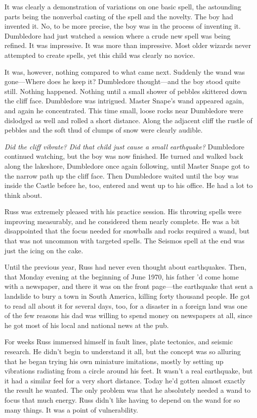 It was clearly a demonstration of variations on one basic spell, the astounding parts being the nonverbal casting of the spell and the novelty. The boy had invented it. No, to be more precise, the boy was in the process of inventing it. Dumbledore had just watched a session where a crude new spell was being refined. It was impressive. It was more than impressive. Most older wizards never attempted to create spells, yet this child was clearly no novice.

It was, however, nothing compared to what came next. Suddenly the wand was gone—Where does he keep it? Dumbledore thought—and the boy stood quite still. Nothing happened. Nothing until a small shower of pebbles skittered down the cliff face. Dumbledore was intrigued. Master Snape's wand appeared again, and again he concentrated. This time small, loose rocks near Dumbledore were dislodged as well and rolled a short distance. Along the adjacent cliff the rustle of pebbles and the soft thud of clumps of snow were clearly audible.

\emph{Did the cliff vibrate? Did that child just cause a small earthquake?} Dumbledore continued watching, but the boy was now finished. He turned and walked back along the lakeshore, Dumbledore once again following, until Master Snape got to the narrow path up the cliff face. Then Dumbledore waited until the boy was inside the Castle before he, too, entered and went up to his office. He had a lot to think about.

Russ was extremely pleased with his practice session. His throwing spells were improving measurably, and he considered them nearly complete. He was a bit disappointed that the focus needed for snowballs and rocks required a wand, but that was not uncommon with targeted spells. The Seismos spell at the end was just the icing on the cake.

Until the previous year, Russ had never even thought about earthquakes. Then, that Monday evening at the beginning of June 1970, his father 'd come home with a newspaper, and there it was on the front page—the earthquake that sent a landslide to bury a town in South America, killing forty thousand people. He got to read all about it for several days, too, for a disaster in a foreign land was one of the few reasons his dad was willing to spend money on newspapers at all, since he got most of his local and national news at the pub.

For weeks Russ immersed himself in fault lines, plate tectonics, and seismic research. He didn't begin to understand it all, but the concept was so alluring that he began trying his own miniature imitations, mostly by setting up vibrations radiating from a circle around his feet. It wasn't a real earthquake, but it had a similar feel for a very short distance. Today he'd gotten almost exactly the result he wanted. The only problem was that he absolutely needed a wand to focus that much energy. Russ didn't like having to depend on the wand for so many things. It was a point of vulnerability.


